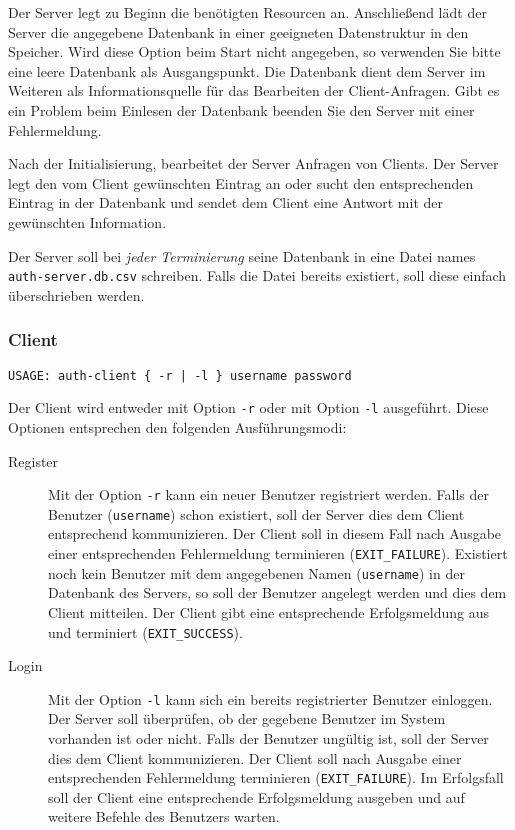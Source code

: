 Der Server legt zu Beginn die benötigten Resourcen an. Anschließend lädt der
Server die angegebene Datenbank in einer geeigneten Datenstruktur in den
Speicher. Wird diese Option beim Start nicht angegeben, so verwenden Sie bitte
eine leere Datenbank als Ausgangspunkt. Die Datenbank dient dem Server im
Weiteren als Informationsquelle für das Bearbeiten der Client-Anfragen. Gibt es
ein Problem beim Einlesen der Datenbank beenden Sie den Server mit einer
Fehlermeldung.

Nach der Initialisierung, bearbeitet der Server Anfragen von Clients. Der
Server legt den vom Client gewünschten Eintrag an oder sucht den entsprechenden
Eintrag in der Datenbank und sendet dem Client eine Antwort mit der gewünschten
Information.

Der Server soll bei \textit{jeder Terminierung} seine Datenbank in eine Datei
names \texttt{auth-server.db.csv} schreiben. Falls die Datei bereits existiert,
soll diese einfach überschrieben werden.

\subsubsection*{Client}
\begin{verbatim}
USAGE: auth-client { -r | -l } username password
\end{verbatim}

Der Client wird entweder mit Option \texttt{-r} oder mit Option \texttt{-l}
ausgeführt. Diese Optionen entsprechen den folgenden Ausführungsmodi:

\begin{description}
  \item[Register] Mit der Option \texttt{-r} kann ein neuer Benutzer
    registriert werden. Falls der Benutzer (\texttt{username}) schon existiert,
    soll der Server dies dem Client entsprechend kommunizieren. Der Client soll
    in diesem Fall nach Ausgabe einer entsprechenden Fehlermeldung terminieren
    (\texttt{EXIT\_FAILURE}).  Existiert noch kein Benutzer mit dem angegebenen
    Namen (\texttt{username}) in der Datenbank des Servers, so soll der
    Benutzer angelegt werden und dies dem Client mitteilen. Der Client gibt
    eine entsprechende Erfolgsmeldung aus und terminiert
    (\texttt{EXIT\_SUCCESS}).
  \item[Login] Mit der Option \texttt{-l} kann sich ein
    bereits registrierter Benutzer einloggen. Der Server soll überprüfen, ob
    der gegebene Benutzer im System vorhanden ist oder nicht. Falls der
    Benutzer ungültig ist, soll der Server dies dem Client kommunizieren. Der
    Client soll nach Ausgabe einer entsprechenden Fehlermeldung terminieren
    (\texttt{EXIT\_FAILURE}).  Im Erfolgsfall soll der Client eine
    entsprechende Erfolgsmeldung ausgeben und auf weitere Befehle des Benutzers
    warten.
\end{description}

